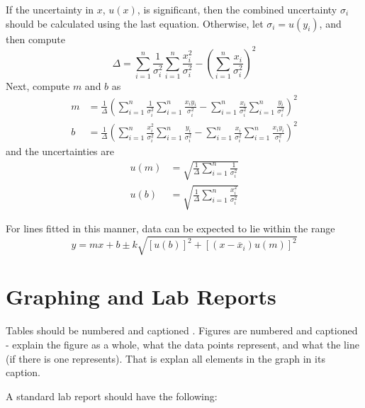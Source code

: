 \documentclass[12pt, a4paper, oneside, openright, titlepage]{book}
\begin{document}
\begin{appendices}
    If the uncertainty in $x$, $u(x)$, is significant, then the combined uncertainty $\sigma_i$ should be calculated using the last equation. Otherwise, let $\sigma_i = u(y_i)$, and then compute $$\Delta = \sum_{i=1}^n\frac{1}{\sigma_i^2}\sum_{i=1}^n\frac{x_i^2}{\sigma_i^2} - \left(\sum_{i=1}^n \frac{x_i}{\sigma_i^2}\right)^2$$ Next, compute $m$ and $b$ as \begin{align*}
        m &= \frac{1}{\Delta}\left(\sum_{i=1}^n\frac{1}{\sigma_i^2}\sum_{i=1}^n\frac{x_iy_i}{\sigma_i^2} - \sum_{i=1}^n \frac{x_i}{\sigma_i^2}\sum_{i=1}^n\frac{y_i}{\sigma_i^2}\right)^2 \\
        b &= \frac{1}{\Delta}\left(\sum_{i=1}^n\frac{x_i^2}{\sigma_i^2}\sum_{i=1}^n\frac{y_i}{\sigma_i^2} - \sum_{i=1}^n \frac{x_i}{\sigma_i^2}\sum_{i=1}^n\frac{x_iy_i}{\sigma_i^2}\right)^2
    \end{align*}
    and the uncertainties are \begin{align*}
        u(m) &= \sqrt{\frac{1}{\Delta}\sum_{i=1}^n\frac{1}{\sigma_i^2}} \\
        u(b) &= \sqrt{\frac{1}{\Delta}\sum_{i=1}^n\frac{x_i^2}{\sigma_i^2}}
    \end{align*}

    For lines fitted in this manner, data can be expected to lie within the range $$y = mx+b \pm k\sqrt{[u(b)]^2+[(x-\overline{x}_i)u(m)]^2}$$

    

    \section{Graphing and Lab Reports}

    Tables should be numbered and captioned . Figures are numbered and captioned  - explain the figure as a whole, what the data points represent, and what the line (if there is one represents). That is explan all elements in the graph in its caption.

    A standard lab report should have the following:


\end{appendices}
\end{document}
